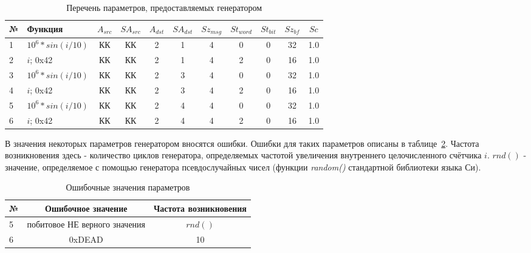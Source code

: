 \begin{table}[H]
\centering
\begin{tabular}{|l|l|*{9}{c|}}
\hline
 № & Функция & $A_{src}$ & $SA_{src}$ & $A_{dst}$ & $SA_{dst}$ & $Sz_{msg}$ & 
$St_{word}$ & $St_{bit}$ & $Sz_{bf}$ & $Sc$ \\
\hline
1 & $10^6 * sin(i / 10)$ & КК & КК & 2 & 1 & 4 & 0 & 0 & 32 & 1.0 \\
2 & $i$; 0x42 & КК & КК & 2 & 1 & 4 & 2 & 0 & 16 & 1.0 \\
3 & $10^6 * sin(i / 10)$ & КК & КК & 2 & 3 & 4 & 0 & 0 & 32 & 1.0 \\
4 & $i$; 0x42 & КК & КК & 2 & 3 & 4 & 2 & 0 & 16 & 1.0 \\
5 & $10^6 * sin(i / 10)$ & КК & КК & 2 & 4 & 4 & 0 & 0 & 32 & 1.0 \\
6 & $i$; 0x42 & КК & КК & 2 & 4 & 4 & 2 & 0 & 16 & 1.0 \\
\hline 
\end{tabular}
\caption{Перечень параметров, предоставляемых генератором}
\label{tab:params}
\end{table}

В значения некоторых параметров генератором вносятся ошибки. Ошибки 
для таких параметров описаны в таблице~\ref{tab:param_errors}. Частота 
возникновения здесь - количество циклов генератора, определяемых частотой 
увеличения внутреннего целочисленного счётчика $i$. $rnd()$ - значение, 
определяемое с помощью генератора псевдослучайных чисел (функции 
\textit{random()} стандартной библиотеки языка Си).

\begin{table}[H]
 \centering
 \begin{tabular}{|l|c|c|}
  \hline
  № & Ошибочное значение & Частота возникновения \\
  \hline
  5 & побитовое НЕ верного значения & $rnd()$ \\
  6 & 0xDEAD & 10 \\
  \hline
 \end{tabular}
 \caption{Ошибочные значения параметров}
 \label{tab:param_errors}
\end{table}




